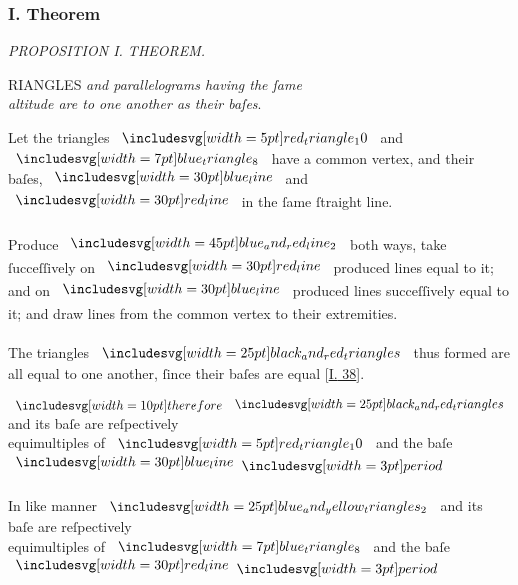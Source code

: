 \documentclass[12pt,preview]{standalone}
\begin{document}
\subsubsection{I. Theorem}

\begin{minipage}[t]{0.33\textwidth}
    \vspace{40pt}
    
\end{minipage}%
\hfill
\begin{minipage}[t]{0.64\textwidth}
    \vspace{0pt}

    \begin{center}
        \textit{PROPOSITION I. THEOREM.}\label{book6pr1} \\
    \end{center}

    \hfill

    \begin{center}
        \raggedright \lettrine[lines=4, loversize=1, nindent=0pt]{}{}RIANGLES \textit{and parallelograms having the ſame\\ altitude are to one another as their baſes}.
    \end{center}

    \hfill

    \hfill

    \hfill

    \raggedright Let the triangles $\img[0][0][5]{red_triangle_10}$ and $\img[0][0][7]{blue_triangle_8}$  have a common vertex, and their baſes, $\blueline$ and $\redline$ in the ſame ſtraight line.\\
    \hfill\\
    Produce $\bimg{blue_and_red_line_2}$ both ways, take ſucceſſively on $\redline$ produced lines equal to it; and on $\blueline$ produced lines succeſſively equal to it; and draw lines from the common vertex to their extremities.\\
    \hfill\\
    The triangles $\img{black_and_red_triangles}$ thus formed are all equal to one another, ſince their baſes are equal [\hyperref[book1pr38]{\textsc{I.} 38}].

    \hfill

    \begin{center}
        $\btherefore \img{black_and_red_triangles}$ and its baſe are reſpectively\\
        equimultiples of $\img[0][0][5]{red_triangle_10}$ and the baſe $\blueline \bperiod$\\
        \hfill\\
        In like manner $\img{blue_and_yellow_triangles_2}$ and its baſe are reſpectively\\
        equimultiples of $\img[0][0][7]{blue_triangle_8}$ and the baſe $\redline \bperiod$
    \end{center}

\end{minipage}%
\end{document}
